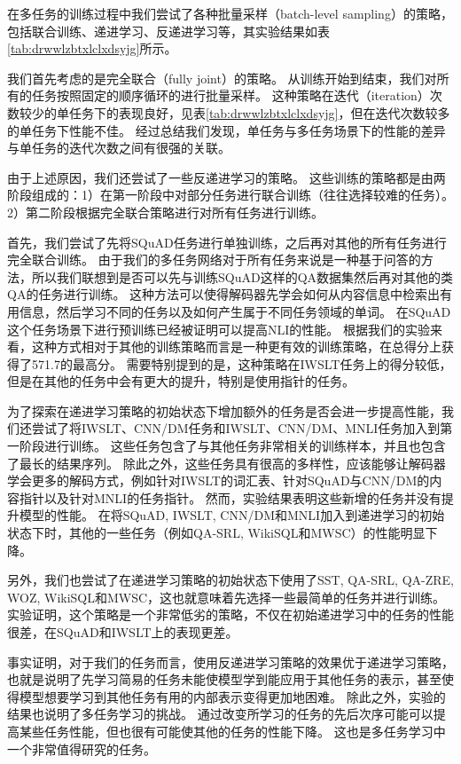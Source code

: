 在多任务的训练过程中我们尝试了各种批量采样（batch-level sampling）的策略，包括联合训练、递进学习、反递进学习等，其实验结果如表\ref{tab:drwwlzbtxlclxdsyjg}所示。

我们首先考虑的是完全联合（fully joint）的策略。
从训练开始到结束，我们对所有的任务按照固定的顺序循环的进行批量采样。
这种策略在迭代（iteration）次数较少的单任务下的表现良好，见表\ref{tab:drwwlzbtxlclxdsyjg}，但在迭代次数较多的单任务下性能不佳。
经过总结我们发现，单任务与多任务场景下的性能的差异与单任务的迭代次数之间有很强的关联。

由于上述原因，我们还尝试了一些反递进学习的策略\cite{Bengio2009Curriculum}。
这些训练的策略都是由两阶段组成的：1）在第一阶段中对部分任务进行联合训练（往往选择较难的任务）。2）第二阶段根据完全联合策略进行对所有任务进行训练。

首先，我们尝试了先将SQuAD任务进行单独训练，之后再对其他的所有任务进行完全联合训练。
由于我们的多任务网络对于所有任务来说是一种基于问答的方法，所以我们联想到是否可以先与训练SQuAD这样的QA数据集然后再对其他的类QA的任务进行训练。
这种方法可以使得解码器先学会如何从内容信息中检索出有用信息，然后学习不同的任务以及如何产生属于不同任务领域的单词。
在SQuAD这个任务场景下进行预训练已经被证明可以提高NLI的性能\cite{min2017question}。
根据我们的实验来看，这种方式相对于其他的训练策略而言是一种更有效的训练策略，在总得分上获得了571.7的最高分。
需要特别提到的是，这种策略在IWSLT任务上的得分较低，但是在其他的任务中会有更大的提升，特别是使用指针的任务。

为了探索在递进学习策略的初始状态下增加额外的任务是否会进一步提高性能，我们还尝试了将IWSLT、CNN/DM任务和IWSLT、CNN/DM、MNLI任务加入到第一阶段进行训练。
这些任务包含了与其他任务非常相关的训练样本，并且也包含了最长的结果序列。
除此之外，这些任务具有很高的多样性，应该能够让解码器学会更多的解码方式，例如针对IWSLT的词汇表、针对SQuAD与CNN/DM的内容指针以及针对MNLI的任务指针。
然而，实验结果表明这些新增的任务并没有提升模型的性能。
在将SQuAD, IWSLT, CNN/DM和MNLI加入到递进学习的初始状态下时，其他的一些任务（例如QA-SRL, WikiSQL和MWSC）的性能明显下降。

另外，我们也尝试了在递进学习策略的初始状态下使用了SST, QA-SRL, QA-ZRE, WOZ, WikiSQL和MWSC，这也就意味着先选择一些最简单的任务并进行训练。
实验证明，这个策略是一个非常低劣的策略，不仅在初始递进学习中的任务的性能很差，在SQuAD和IWSLT上的表现更差。

事实证明，对于我们的任务而言，使用反递进学习策略的效果优于递进学习策略，也就是说明了先学习简易的任务未能使模型学到能应用于其他任务的表示，甚至使得模型想要学习到其他任务有用的内部表示变得更加地困难。
除此之外，实验的结果也说明了多任务学习的挑战。
通过改变所学习的任务的先后次序可能可以提高某些任务性能，但也很有可能使其他的任务的性能下降。
这也是多任务学习中一个非常值得研究的任务。



